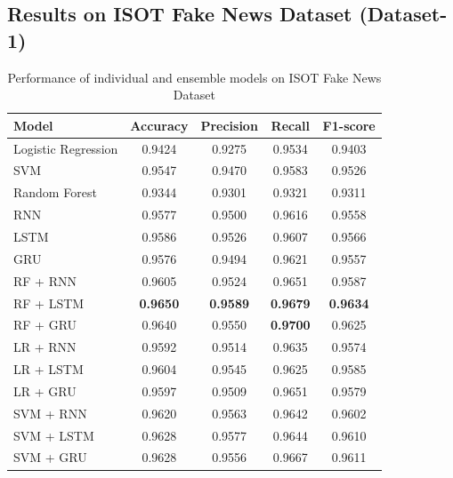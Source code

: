 \documentclass[conference]{IEEEtran}
\begin{document}
\subsection{Results on ISOT Fake News Dataset (Dataset-1)}
\begin{table}[H]
\centering
\caption{Performance of individual and ensemble models on ISOT Fake News Dataset}
\label{tab:isot_main}
\footnotesize
{}
\begin{tabular}{l S[table-format=1.4] S[table-format=1.4] S[table-format=1.4] S[table-format=1.4]}
\toprule
{Model} & {Accuracy} & {Precision} & {Recall} & {F1-score} \\
\midrule
Logistic Regression     & 0.9424 & 0.9275 & 0.9534 & 0.9403 \\
SVM                     & 0.9547 & 0.9470 & 0.9583 & 0.9526 \\
Random Forest           & 0.9344 & 0.9301 & 0.9321 & 0.9311 \\
RNN                     & 0.9577 & 0.9500 & 0.9616 & 0.9558 \\
LSTM                    & 0.9586 & 0.9526 & 0.9607 & 0.9566 \\
GRU                     & 0.9576 & 0.9494 & 0.9621 & 0.9557 \\
\midrule
RF + RNN                & 0.9605 & 0.9524 & 0.9651 & 0.9587 \\
RF + LSTM               & \textbf{0.9650} & \textbf{0.9589} & \textbf{0.9679} & \textbf{0.9634} \\
RF + GRU                & 0.9640 & 0.9550 & \textbf{0.9700} & 0.9625 \\
LR + RNN                & 0.9592 & 0.9514 & 0.9635 & 0.9574 \\
LR + LSTM               & 0.9604 & 0.9545 & 0.9625 & 0.9585 \\
LR + GRU                & 0.9597 & 0.9509 & 0.9651 & 0.9579 \\
SVM + RNN               & 0.9620 & 0.9563 & 0.9642 & 0.9602 \\
SVM + LSTM              & 0.9628 & 0.9577 & 0.9644 & 0.9610 \\
SVM + GRU               & 0.9628 & 0.9556 & 0.9667 & 0.9611 \\
\bottomrule
\end{tabular}
\end{table}
\end{document}
